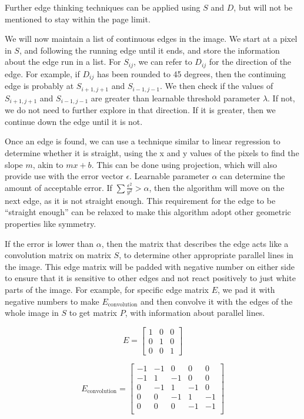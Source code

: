 \documentclass[11pt]{article}
\begin{document}
Further edge thinking techniques can be applied using $S$ and $D$, but will not be mentioned to stay within the page limit.

We will now maintain a list of continuous edges in the image. We start at a
pixel in $S$, and following the running edge until it ends, and store the
information about the edge run in a list. For $S_{ij}$, we can refer to
$D_{ij}$ for the direction of the edge. For example, if $D_{ij}$ has been
rounded to 45 degrees, then the continuing edge is probably at $S_{i+1, j + 1}$
and $S_{i-1, j-1}$. We then check if the values of $S_{i+1, j+1}$ and $S_{i-1,
j-1}$ are greater than learnable threshold parameter $\lambda$. If not, we do
not need to further explore in that direction. If it is greater, then we
continue down the edge until it is not.

Once an edge is found, we can use a technique similar to linear regression to
determine whether it is straight, using the x and y values of the pixels to
find the slope $m$, akin to $mx + b$. This can be done using projection, which
will also provide use with the error vector $\epsilon$.  Learnable parameter
$\alpha$ can determine the amount of acceptable error. If $\sum
\frac{\epsilon^2}{y^2} > \alpha$, then the algorithm will move on the next
edge, as it is not straight enough. This requirement for the edge to be
``straight enough'' can be relaxed to make this algorithm adopt other geometric properties like symmetry.

If the error is lower than $\alpha$, then the matrix that describes the edge
acts like a convolution matrix on matrix $S$, to determine other appropriate
parallel lines in the image. This edge matrix will be padded with negative
number on either side to ensure that it is sensitive to other edges and not
react positively to just white parts of the image. For example, for specific
edge matrix $E$, we pad it with negative numbers to make $E_\text{convolution}$
and then convolve it with the edges of the whole image in $S$ to get matrix $P$, with information about parallel lines.

$$E = \begin{bmatrix}
  1 & 0 & 0 \\
  0 & 1 & 0 \\
  0 & 0 & 1
\end{bmatrix}$$


$$E_\text{convolution} = \begin{bmatrix}
  -1 & -1 & 0 & 0 & 0\\
  -1 & 1  & -1 & 0 & 0 \\
  0  & -1 & 1 & -1 & 0 \\
  0  & 0  & -1 & 1 & -1 \\
  0  & 0  & 0 & -1 & -1 \\
\end{bmatrix}$$
\end{document}

